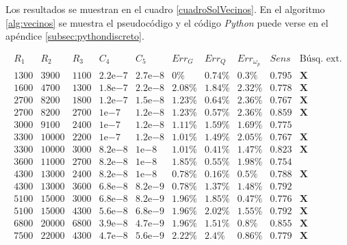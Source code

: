 \documentclass{llncs}
\newcommand{\expnumber}[2]{{#1}\mathrm{e}{#2}}
\begin{document}
	Los resultados se muestran en el cuadro \ref{cuadroSolVecinos}. En el algoritmo \ref{alg:vecinos} se muestra el pseudocódigo y el 
	código \textit{Python} puede verse en el apéndice \ref{subsec:pythondiscreto}.
	
	\begin{table}[H]
		$$
		\begin{array}{|c|c|c|c|c|c|c|c|c|c|}
		\hline
		R_1 & R_2 & R_3 & C_4 & C_5 & Err_G & Err_Q & Err_{\omega_p} & Sens & \text{B\'usq. ext.}   \\
		\hline
		1300 & 3900 & 1100 & \expnumber{2.2}{-7} & \expnumber{2.7}{-8} & 0\% & 0.74\% & 0.3\% & 0.795 & \textbf{X} \\
		1600 & 4700 & 1300 & \expnumber{1.8}{-7} & \expnumber{2.2}{-8} & 2.08\% & 1.84\% & 2.32\% & 0.778 & \textbf{X} \\
		2700 & 8200 & 1800 & \expnumber{1.2}{-7} & \expnumber{1.5}{-8} & 1.23\% & 0.64\% & 2.36\% & 0.767 & \textbf{X} \\
		2700 & 8200 & 2700 & \expnumber{1}{-7} & \expnumber{1.2}{-8} & 1.23\% & 0.57\% & 2.36\% & 0.859 & \textbf{X} \\
		3000 & 9100 & 2400 & \expnumber{1}{-7} & \expnumber{1.2}{-8}  & 1.11\% & 1.59\% & 1.69\% & 0.775 &  \\
		3300 & 10000 & 2200 & \expnumber{1}{-7} & \expnumber{1.2}{-8} & 1.01\% & 1.49\% & 2.05\% & 0.767 & \textbf{X} \\
		3300 & 10000 & 3000 & \expnumber{8.2}{-8} & \expnumber{1}{-8} & 1.01\% & 0.41\% & 1.47\% & 0.823 & \textbf{X} \\
		3600 & 11000 & 2700 & \expnumber{8.2}{-8} & \expnumber{1}{-8}  & 1.85\% & 0.55\% & 1.98\% & 0.754 & \\
		4300 & 13000 & 2400 & \expnumber{8.2}{-8} & \expnumber{1}{-8} & 0.78\% & 0.16\% & 0.5\% & 0.788 & \textbf{X} \\
		4300 & 13000 & 3600 & \expnumber{6.8}{-8} & \expnumber{8.2}{-9} & 0.78\% & 1.37\% & 1.48\% & 0.792 & \\
		5100 & 15000 & 3000 & \expnumber{6.8}{-8} & \expnumber{8.2}{-9} & 1.96\% & 1.85\% & 0.47\% & 0.776 & \textbf{X} \\
		5100 & 15000 & 4300 & \expnumber{5.6}{-8} & \expnumber{6.8}{-9} & 1.96\% & 2.02\% & 1.55\% & 0.792 & \textbf{X} \\
		6800 & 20000 & 6800 & \expnumber{3.9}{-8} & \expnumber{4.7}{-9} & 1.96\% & 1.51\% & 0.8\% & 0.855 & \textbf{X} \\
		7500 & 22000 & 4300 & \expnumber{4.7}{-8} & \expnumber{5.6}{-9} & 2.22\% & 2.4\% & 0.86\% & 0.779 & \textbf{X} \\

\end{array}$$
\end{table}
\end{document}
